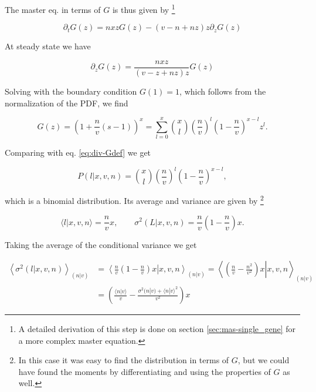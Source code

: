 The master eq. in terms of $G$ is thus given by \footnote{A detailed derivation of this step is done on section \ref{sec:mas-single_gene} for a more complex master equation.}

\begin{equation*}
  \partial_tG(z) = nxzG(z) - (v-n+nz)z\partial_zG(z)
\end{equation*}

At steady state we have

\begin{equation}
  \partial_zG(z) = \frac{nxz}{(v-z+nz)z}G(z)
\end{equation}

Solving with the boundary condition $G(1) = 1$, which follows from the normalization of the PDF, we find

\begin{equation}
  G(z) = \left(1+\frac{n}{v}\left(s-1\right)\right)^x = \sum_{l=0}^x {x\choose l}\left(\frac{n}{v}\right)^l\left(1-\frac{n}{v}\right)^{x-l}z^l.
\end{equation}

Comparing with eq. \eqref{eq:div-Gdef} we get

\begin{equation*}
  P(l|x,v,n) = {x\choose l}\left(\frac{n}{v}\right)^l\left(1-\frac{n}{v}\right)^{x-l},
\end{equation*}

which is a binomial distribution. Its average and variance are given by \footnote{In this case it was easy to find the distribution in terms of $G$, but we could have found the moments by differentiating and using the properties of $G$ as well.}

\begin{equation*}
  \langle l|x,v,n\rangle = \frac{n}{v}x, \quad\quad \sigma^2(L|x,v,n) = \frac{n}{v}\left(1-\frac{n}{v}\right)x.
\end{equation*}

Taking the average of the conditional variance we get

\begin{equation*}
  \begin{split}
    \left\langle\sigma^2(l|x,v,n)\right\rangle_{(n|v)} &= \left\langle\left.\frac{n}{v}\left(1-\frac{n}{v}\right)x\right|x,v,n\right\rangle_{(n|v)} = \left\langle\left.\left(\frac{n}{v}-\frac{n^2}{v^2}\right)x\right|x,v,n\right\rangle_{(n|v)}\\
    &= \left(\frac{\langle n|v\rangle}{v}-\frac{\sigma^2(n|v) + \langle n|v\rangle^2}{v^2}\right)x
  \end{split}
\end{equation*}

